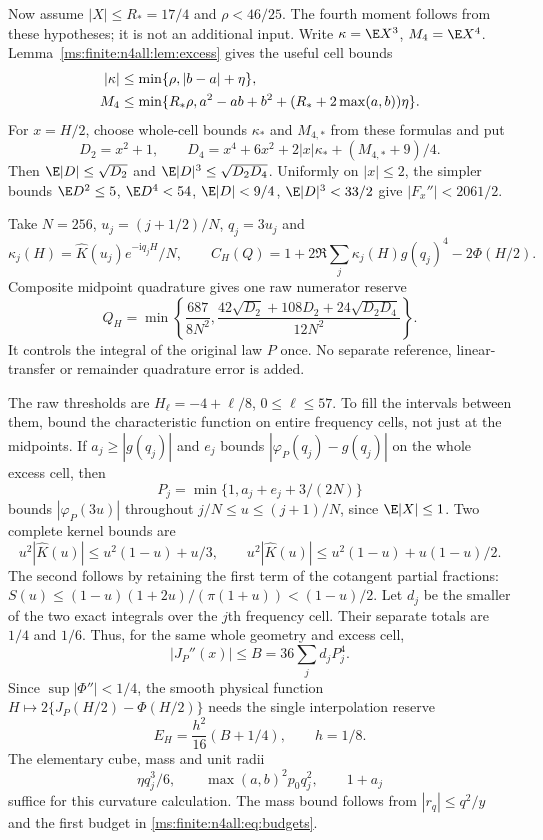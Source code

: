 Now assume $|X|\le R_*=17/4$ and $\rho<46/25$.
The fourth moment follows from these hypotheses; it is not an
additional input. Write $\kappa=\E X^3$, $M_4=\E X^4$.
Lemma~\ref{ms:finite:n4all:lem:excess} gives the useful cell bounds
\begin{align}
 |\kappa|&\le\min\{\rho,|b-a|+\eta\},\notag\\
 M_4&\le\min\{R_*\rho, a^2-ab+b^2+
                         (R_*+2\max(a,b))\eta\}.
 \label{ms:finite:n4all:eq:local-moments}
\end{align}
For $x=H/2$, choose whole-cell bounds $\kappa_*$ and $M_{4,*}$
from these formulas and put
\[
 D_2=x^2+1,\qquad
 D_4=x^4+6x^2+2|x|\kappa_*+(M_{4,*}+9)/4.
\]
Then $\E|D|\le\sqrt{D_2}$ and
$\E|D|^3\le\sqrt{D_2D_4}$. Uniformly on $|x|\le2$, the simpler
bounds $\E D^2\le5$, $\E D^4<54$, $\E|D|<9/4$,
$\E|D|^3<33/2$ give $|F_x''|<2061/2$.

Take $N=256$, $u_j=(j+1/2)/N$, $q_j=3u_j$ and
\[
 \kappa_j(H)=\widehat K(u_j)e^{-\mathrm i q_jH}/N,\qquad
 C_H(Q)=1+2\Re\sum_j\kappa_j(H)g(q_j)^4-2\Phi(H/2).
\]
Composite midpoint quadrature gives one raw numerator reserve
\begin{equation}\label{ms:finite:n4all:eq:midpoint}
 Q_H=\min\left\{\frac{687}{8N^2},
 \frac{42\sqrt{D_2}+108D_2+24\sqrt{D_2D_4}}{12N^2}\right\}.
\end{equation}
It controls the integral of the original law $P$ once. No separate
reference, linear-transfer or remainder quadrature error is added.

The raw thresholds are $H_\ell=-4+\ell/8$, $0\le\ell\le57$.
To fill the intervals between them, bound the characteristic function
on entire frequency cells, not just at the midpoints. If
$a_j\ge|g(q_j)|$ and $e_j$ bounds $|\varphi_P(q_j)-g(q_j)|$ on the
whole excess cell, then
\[
 P_j=\min\{1,a_j+e_j+3/(2N)\}
\]
bounds $|\varphi_P(3u)|$ throughout $j/N\le u\le(j+1)/N$,
since $\E|X|\le1$. Two complete kernel bounds are
\[
 u^2|\widehat K(u)|\le u^2(1-u)+u/3,\qquad
 u^2|\widehat K(u)|\le u^2(1-u)+u(1-u)/2.
\]
The second follows by retaining the first term of the cotangent
partial fractions:
$S(u)\le(1-u)(1+2u)/(\pi(1+u))<(1-u)/2$.
Let $d_j$ be the smaller of the two exact integrals over the $j$th
frequency cell. Their separate totals are $1/4$ and $1/6$.
Thus, for the same whole geometry and excess cell,
\[
 |J_P''(x)|\le B=36\sum_jd_jP_j^4.
\]
Since $\sup|\Phi''|<1/4$, the smooth physical function
$H\mapsto2\{J_P(H/2)-\Phi(H/2)\}$ needs the single interpolation
reserve
\begin{equation}\label{ms:finite:n4all:eq:H-reserve}
 E_H=\frac{h^2}{16}(B+1/4),\qquad h=1/8.
\end{equation}
The elementary cube, mass and unit radii
\[
 \eta q_j^3/6,\qquad \max(a,b)^2p_0q_j^2,\qquad 1+a_j
\]
suffice for this curvature calculation. The mass bound follows from
$|r_q|\le q^2/y$ and the first budget in
\eqref{ms:finite:n4all:eq:budgets}.

